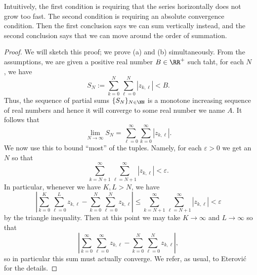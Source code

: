 Intuitively, the first condition is requiring that the series horizontally does not grow too fast. The second condition is requiring an absolute convergence condition. Then the first conclusion says we can sum vertically instead, and the second conclusion says that we can move around the order of summation.
\begin{proof}
	We will sketch this proof; we prove (a) and (b) simultaneously. From the assumptions, we are given a positive real number $B\in\RR^+$ such taht, for each $N$, we have
	\[S_N:=\sum_{k=0}^N\sum_{\ell=0}^N|z_{k,\ell}|<B.\]
	Thus, the sequence of partial sums $\{S_N\}_{N\in\NN}$ is a monotone increasing sequence of real numbers and hence it will converge to some real number we name $A$. It follows that
	\[\lim_{N\to\infty}S_N=\sum_{\ell=0}^\infty\sum_{k=0}^\infty|z_{k,\ell}|.\]
	We now use this to bound ``most'' of the tuples. Namely, for each $\varepsilon>0$ we get an $N$ so that
	\[\sum_{k=N+1}^\infty\sum_{\ell=N+1}^\infty|z_{k,\ell}|<\varepsilon.\]
	In particular, whenever we have $K,L>N$, we have
	\[\left|\sum_{k=0}^K\sum_{\ell=0}^Lz_{k,\ell}-\sum_{k=0}^N\sum_{\ell=0}^Nz_{k,\ell}\right|\le\sum_{k=N+1}^\infty\sum_{\ell=N+1}^\infty|z_{k,\ell}|<\varepsilon\]
	by the triangle inequality. Then at this point we may take $K\to\infty$ and $L\to\infty$ so that
	\[\left|\sum_{k=0}^\infty\sum_{\ell=0}^\infty z_{k,\ell}-\sum_{k=0}^N\sum_{\ell=0}^Nz_{k,\ell}\right|,\]
	so in particular this sum must actually converge. We refer, as usual, to Eterovi\'c for the details.\todo{}
\end{proof}

